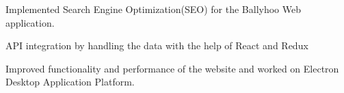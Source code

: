 \begin{cventries}
{\begin{cvitems}
        \item {Implemented Search Engine Optimization(SEO) for the Ballyhoo Web application.}
        \item {API integration by handling the data with the help of React and Redux}
        \item {Improved functionality and performance of the website and worked on Electron Desktop Application Platform.}
      \end{cvitems}
    }


\end{cventries}
